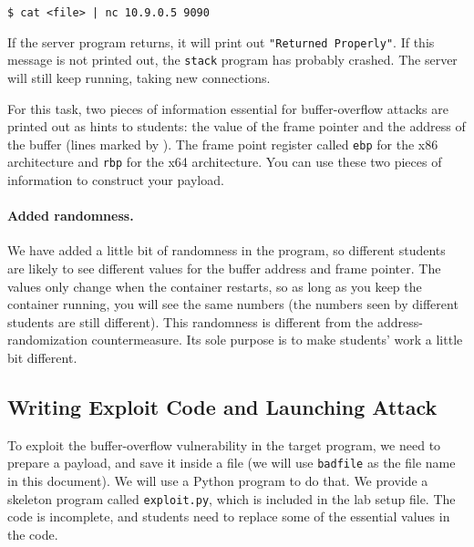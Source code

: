 \begin{lstlisting}
$ cat <file> | nc 10.9.0.5 9090
\end{lstlisting}

If the server program returns, it will print out \texttt{"Returned Properly"}.
If this message is not printed out, the \texttt{stack} program has probably crashed. 
The server will still keep running, taking new connections.  

For this task, two pieces of information essential for buffer-overflow 
attacks are printed out as hints to students: 
the value of the frame pointer and the address
of the buffer (lines marked by ). The frame point register 
called \texttt{ebp} for the x86 architecture and \texttt{rbp} for the x64 architecture.
You can use these two pieces of information to construct 
your payload. 


\paragraph{Added randomness.} We have added a little bit of randomness
in the program, so different students are likely to see different values
for the buffer address and frame pointer. The values only change 
when the container restarts, so as long as you keep the 
container running, you will see the same numbers (the numbers 
seen by different students are still different). This randomness
is different from the address-randomization countermeasure. Its sole
purpose is to make students' work a little bit different. 


\subsection{Writing Exploit Code and Launching Attack} 

To exploit the buffer-overflow vulnerability in the target program,
we need to prepare a payload, and save it inside a file (we will use 
\texttt{badfile} as the file name in this document). 
We will use a Python program to do that.
We provide a skeleton program called \texttt{exploit.py}, which
is included in the lab setup file. 
The code is incomplete, and students need to replace some of the essential 
values in the code. 


\newcommand{\needtochange}{\ding{73} Need to change \ding{73}}


